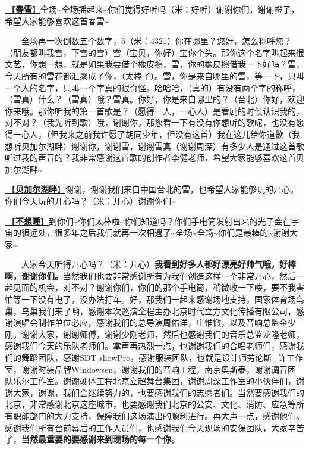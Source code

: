 \documentclass[]{ctexbook}
\begin{document}
\hyperref[spring-snow]{🎵【\textbf{春雪}】}全场\textasciitilde 全场摇起来\textasciitilde 你们觉得好听吗（米：好听）谢谢你们，谢谢橙子，希望大家能够喜欢这首春雪\textasciitilde{}

  全场再一次倒数五个数字，5（米：4321）你在哪里？您好，怎么称呼您？（朋友都叫我雪，下雪的雪）雪（宝贝，你好）宝你个头。那你这个名字叫起来很文艺，你想一想，就是如果我要借个橡皮擦，雪，你的橡皮擦借我一下好吗？雪，今天所有的雪花都汇聚成了你，（太棒了）。雪，你是来自哪里的雪，等一下，只叫一个人的名字，只叫一个字真的很奇怪。哈哈哈，（真的）有没有两个字的称呼，（雪真）什么？（雪真）哦？雪真。你好，你是来自哪里的？（台北）你好，欢迎你来哦。那你听我的第一首歌是？（愿得一人，一心人）是看剧的时候认识我的，对不对？（我先听到歌）哦，谢谢你，那您看一下有没有你想听的歌呢，也没有愿得一心人，（但我来之前我许愿了胡同少年，但没有这首）我在这儿给你道歉（我想听贝加尔湖畔）谢谢你，谢谢雪，谢谢雪真（谢谢周深）有多少人是通过这首歌听过我的声音的？我非常感谢这首歌的创作者李健老师，希望大家能够喜欢这首贝加尔湖畔\textasciitilde{}

\hyperref[lake-baikal]{🎵【\textbf{贝加尔湖畔}】}谢谢，谢谢我们来自中国台北的雪，也希望大家能够玩的开心。你们今天玩的开心吗？（米：开心）谢谢你们\textasciitilde{}

\hyperref[donot-want-to-sleep]{🎵【\textbf{不想睡}】}到你们\textasciitilde 你们太棒啦\textasciitilde 你们知道吗？你们手电筒发射出来的光子会在宇宙的很远处，很多年之后我们就再一次相遇了\textasciitilde 全场\textasciitilde 全场\textasciitilde 你们是最棒的\textasciitilde 谢谢大家\textasciitilde{}

  大家今天听得开心吗？（米：开心）\textbf{我看到好多人都好漂亮好帅气哦，好棒啊，谢谢你们。}当然我们也要非常感谢所有为我们创造这样一个非常开心，然后一起见面的机会，对不对？谢谢你们，你们的那个手电筒，稍微收一下喽，要不我害怕等一下没有电了，没办法打车。好，那我们一起来感谢场地支持，国家体育场鸟巢，鸟巢我们来了哟，感谢本次巡演全程主办北京时代立方文化传播有限公司，感谢演唱会制作单位必应，感谢我们的总导演周佑洋，庄惟惞，以及音响总监金少刚。谢谢大家，谢谢师傅，谢谢少刚老师，然后也感谢我们的音乐总监龙隆老师，感谢我们今天的乐队老师们。掌声再热烈一点，也谢谢我们的合唱老师们，感谢我们的舞蹈团队，感谢SDT showPro，感谢服装团队，也就是设计师劳伦斯·许工作室，谢谢时装品牌Windowsen，谢谢我们的音响工程，南京奥斯泰，谢谢调音团队乐尔工作室。谢谢硬体工程北京立超舞台集团，谢谢周深工作室的小伙伴们，谢谢大家，谢谢，我们会继续努力的，也要感谢我们的志愿者们。当然要感谢我们的北京，非常感谢北京这座城市，也要感谢我们北京的公安、文化、消防、应急等所有职能部门的大力支持，保障我们这场演出的顺利进行。再大声一点，感谢他们。感谢我们所有台前幕后的工作人员们，也感谢我们今天现场的安保团队，大家辛苦了，\textbf{当然最重要的要感谢来到现场的每一个你。}
\end{document}
